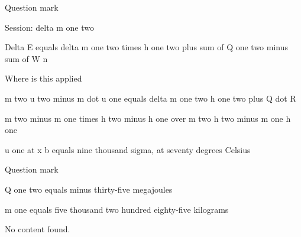 Question mark

Session: delta m one two

Delta E equals delta m one two times h one two plus sum of Q one two minus sum of W n

Where is this applied

m two u two minus m dot u one equals delta m one two h one two plus Q dot R

m two minus m one times h two minus h one over m two h two minus m one h one

u one at x b equals nine thousand sigma, at seventy degrees Celsius

Question mark

Q one two equals minus thirty-five megajoules

m one equals five thousand two hundred eighty-five kilograms

No content found.